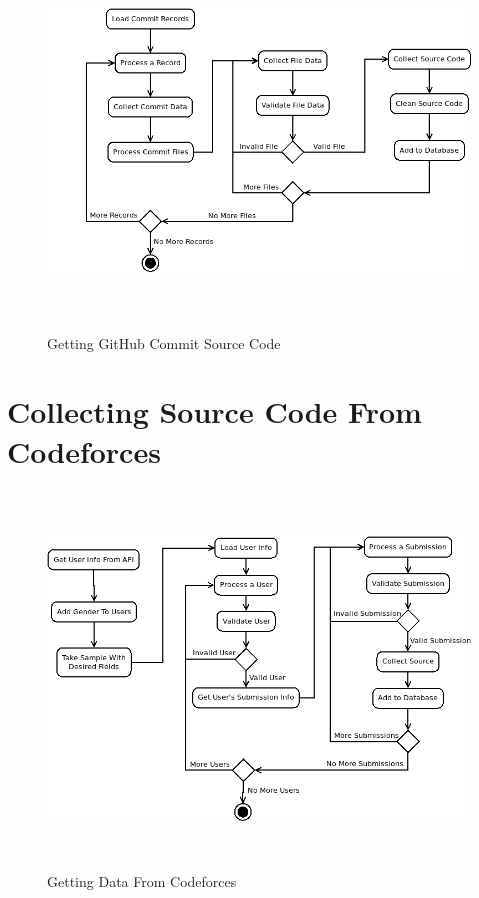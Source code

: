 \documentclass{article}
\begin{document}
\begin{figure}[!h]
    \centering
    \includegraphics[height=10cm]{diagrams/commits.png}
    \caption{Getting GitHub Commit Source Code}
\end{figure}


\section{Collecting Source Code From Codeforces}

\begin{figure}[!h]
    \centering
    \includegraphics[height=10cm]{diagrams/cf_process.png}
    \caption{Getting Data From Codeforces}
\end{figure}
\end{document}
